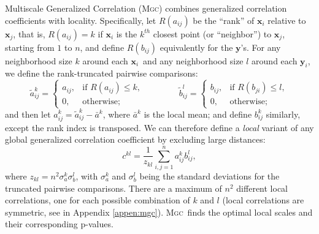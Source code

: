 \documentclass[11pt]{article}
\providecommand{\sct}[1]{{\normalfont\textsc{#1}}}
\providecommand{\mt}[1]{\widetilde{#1}}
\providecommand{\mb}[1]{\boldsymbol{#1}}
\newcommand{\G}{c}
\newcommand{\Mgc}{\sct{Mgc}}
\newcommand{\mby}{\ensuremath{\mb{y}}}
\begin{document}
Multiscale Generalized Correlation (\Mgc) combines generalized correlation coefficients with locality.
Specifically, let $R(a_{ij})$  be the ``rank'' of $\mb{x}_i$ relative to $\mb{x}_j$, that is, $R(a_{ij})=k$ if $\mb{x}_i$ is the $k^{th}$ closest point (or ``neighbor'') to $\mb{x}_j$, starting from $1$ to $n$, and define $R(b_{ij})$ equivalently for the \mby's. For any neighborhood size $k$ around each $\mb{x}_i$~and any neighborhood size $l$ around each $\mb{y}_i$, we define the rank-truncated pairwise comparisons:
\begin{equation}
\label{localCoef2}
    \mt{a}_{ij}^k=
    \begin{cases}
      a_{ij}, & \text{if } R(a_{ij}) \leq k, \\
      0, & \text{otherwise};
    \end{cases} \qquad \qquad
    \mt{b}_{ij}^l=
    \begin{cases}
      b_{ij}, & \text{if } R(b_{ji}) \leq l, \\
      0, & \text{otherwise};
    \end{cases}
\end{equation}
and then let $a^k_{ij}=\mt{a}^k_{ij} - \bar{a}^k$, 
where $\bar{a}^k$ is the local mean;
and define $b^k_{ij}$ similarly, except the rank index is transposed. 
We can therefore define a \emph{local} variant of any global generalized correlation coefficient by  excluding large distances: %
\begin{equation}
\label{localCoef}
\G^{kl}=\dfrac{1}{z_{kl}} {\textstyle \sum_{i,j=1}^n a_{ij}^k b_{ij}^l},
\end{equation}
where $z_{kl}=n^2 \sigma_a^k \sigma_b^l$,  with $\sigma_a^k$ and $\sigma_b^{l}$ being the standard deviations for the truncated pairwise comparisons. There are a maximum of $n^2$ different local correlations, one for each possible combination of $k$ and $l$ (local correlations are symmetric, see in Appendix \ref{appen:mgc}).
\Mgc~finds the optimal local scales and their corresponding p-values.
\end{document}
